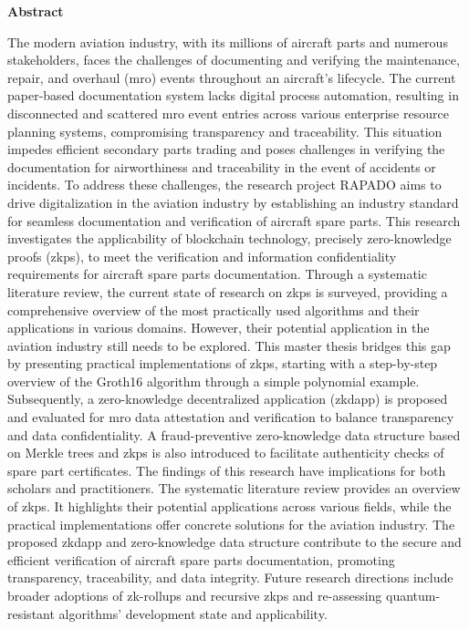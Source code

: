 \thispagestyle{empty}


\vspace*{1cm}

\begin{center}
    \textbf{Abstract}
\end{center}

\vspace*{1cm}
\noindent

The modern aviation industry, with its millions of aircraft parts and numerous stakeholders, faces the challenges of documenting and verifying the maintenance, repair, and overhaul (\acrshort{mro}) events throughout an aircraft's lifecycle. The current paper-based documentation system lacks digital process automation, resulting in disconnected and scattered \acrshort{mro} event entries across various enterprise resource planning systems, compromising transparency and traceability. This situation impedes efficient secondary parts trading and poses challenges in verifying the documentation for airworthiness and traceability in the event of accidents or incidents. To address these challenges, the research project RAPADO aims to drive digitalization in the aviation industry by establishing an industry standard for seamless documentation and verification of aircraft spare parts. This research investigates the applicability of blockchain technology, precisely zero-knowledge proofs (\acrshort{zkp}s), to meet the verification and information confidentiality requirements for aircraft spare parts documentation. Through a systematic literature review, the current state of research on \acrshort{zkp}s is surveyed, providing a comprehensive overview of the most practically used algorithms and their applications in various domains. However, their potential application in the aviation industry still needs to be explored. This master thesis bridges this gap by presenting practical implementations of \acrshort{zkp}s, starting with a step-by-step overview of the Groth16 algorithm through a simple polynomial example. Subsequently, a zero-knowledge decentralized application (\acrshort{zkdapp}) is proposed and evaluated for \acrshort{mro} data attestation and verification to balance transparency and data confidentiality. A fraud-preventive zero-knowledge data structure based on Merkle trees and \acrshort{zkp}s is also introduced to facilitate authenticity checks of spare part certificates. The findings of this research have implications for both scholars and practitioners. The systematic literature review provides an overview of \acrshort{zkp}s. It highlights their potential applications across various fields, while the practical implementations offer concrete solutions for the aviation industry. The proposed \acrshort{zkdapp} and zero-knowledge data structure contribute to the secure and efficient verification of aircraft spare parts documentation, promoting transparency, traceability, and data integrity. Future research directions include broader adoptions of zk-rollups and recursive \acrshort{zkp}s and re-assessing quantum-resistant algorithms' development state and applicability.